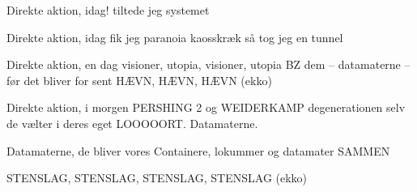 \documentclass[a4paper,11pt]{article}
\begin{document}
\begin{song}

 Direkte aktion, idag!
          tiltede jeg systemet

 Direkte aktion, idag
          fik jeg paranoia
          kaosskræk
          så tog jeg en tunnel

 Direkte aktion, en dag
          visioner, utopia, visioner, utopia
          BZ dem -- datamaterne --
          før det bliver for sent
          HÆVN, HÆVN, HÆVN (ekko)

 Direkte aktion, i morgen
          PERSHING 2 og WEIDERKAMP
          degenerationen selv
          de vælter i deres eget LOOOOORT.
          Datamaterne.

 Datamaterne, de bliver vores
          Containere, lokummer og datamater
          SAMMEN

 STENSLAG, STENSLAG, STENSLAG, STENSLAG (ekko)

\end{song}
\end{document}
